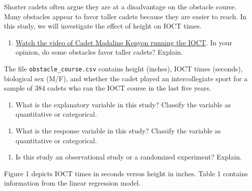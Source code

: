 \documentclass[
]{book}
\providecommand{\tightlist}{%
  \setlength{\itemsep}{0pt}\setlength{\parskip}{0pt}}
\begin{document}
Shorter cadets often argue they are at a disadvantage on the obstacle course. Many obstacles appear to favor taller cadets because they are easier to reach. In this study, we will investigate the effect of height on IOCT times.

\begin{enumerate}
\def\labelenumi{\arabic{enumi}.}
\tightlist
\item
  \href{https://www.youtube.com/watch?v=94tPO0fGtJo\&t=77s}{Watch the video of Cadet Madaline Kenyon running the IOCT}. In your opinion, do some obstacles favor taller cadets? Explain.
\end{enumerate}

\vspace{1in}

The file \texttt{obstacle\_course.csv} contains height (inches), IOCT times (seconds), biological sex (M/F), and whether the cadet played an intercollegiate sport for a sample of 384 cadets who ran the IOCT course in the last five years.

\begin{enumerate}
\def\labelenumi{\arabic{enumi}.}
\setcounter{enumi}{1}
\tightlist
\item
  What is the explanatory variable in this study? Classify the variable as quantitative or categorical.
\end{enumerate}

\vspace{0.25in}

\begin{enumerate}
\def\labelenumi{\arabic{enumi}.}
\setcounter{enumi}{2}
\tightlist
\item
  What is the response variable in this study? Classify the variable as quantitative or categorical.
\end{enumerate}

\vspace{0.25in}

\begin{enumerate}
\def\labelenumi{\arabic{enumi}.}
\setcounter{enumi}{3}
\tightlist
\item
  Is this study an observational study or a randomized experiment? Explain.
\end{enumerate}

\vspace{1in}

\newpage

Figure 1 depicts IOCT times in seconds versus height in inches. Table 1 contains information from the linear regression model.
\end{document}
